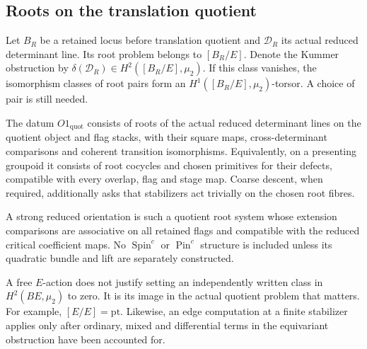 \subsection{Roots on the translation quotient}
\label{app:G-O1-discharge}

Let \(B_R\) be a retained locus before translation quotient and
\(\mathscr D_R\) its actual reduced determinant line. Its root
problem belongs to \([B_R/E]\). Denote the Kummer obstruction by
\(\delta(\mathscr D_R)\in H^2([B_R/E],\mu_2)\).
If this class vanishes, the isomorphism classes of root pairs form an
\(H^1([B_R/E],\mu_2)\)-torsor. A choice of pair is still needed.

\begin{definition}
\label{def:G-O1-quot}
The datum \(O1_{\mathrm{quot}}\) consists of roots of the actual
reduced determinant lines on the quotient object and flag stacks,
with their square maps, cross-determinant comparisons and coherent
transition isomorphisms. Equivalently, on a presenting groupoid it
consists of root cocycles and chosen primitives for their defects,
compatible with every overlap, flag and stage map. Coarse descent,
when required, additionally asks that stabilizers act trivially on
the chosen root fibres.
\end{definition}

\begin{definition}
\label{def:G-strong-reduced-orientation}
A strong reduced orientation is such a quotient root system whose
extension comparisons are associative on all retained flags and
compatible with the reduced critical coefficient maps. No
\(\operatorname{Spin}^c\) or \(\operatorname{Pin}^c\) structure
is included unless its quadratic bundle and lift are separately
constructed.
\end{definition}

A free \(E\)-action does not justify setting an independently
written class in \(H^2(BE,\mu_2)\) to zero. It is its image in
the actual quotient problem that matters. For example,
\([E/E]=\mathrm{pt}\). Likewise, an edge computation at a finite
stabilizer applies only after ordinary, mixed and differential
terms in the equivariant obstruction have been accounted for.

